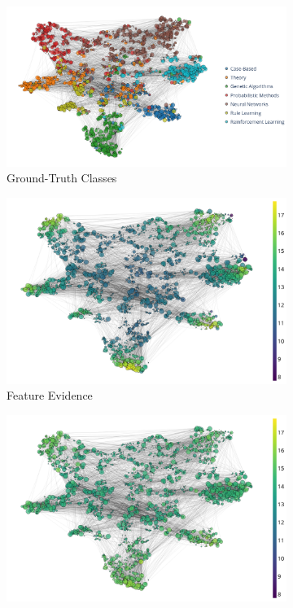\begin{figure}[!h]
    \centering
	\begin{subfigure}[t]{\textwidth}
	    \centering
		\includegraphics[height=0.25\textheight]{sections/009_neurips2021/resources/clean-classes.png}
		\caption{Ground-Truth Classes} 
		\label{subfig:latent-clean-classes}
	\end{subfigure}
	\begin{subfigure}[t]{\textwidth}
	    \centering
		\includegraphics[height=0.25\textheight]{sections/009_neurips2021/resources/clean-ft-evidence.png}
		\caption{Feature Evidence} 
		\label{subfig:latent-clean-feature-evidence}
	\end{subfigure}
	\begin{subfigure}[t]{\textwidth}
	    \centering
		\includegraphics[height=0.25\textheight]{sections/009_neurips2021/resources/clean-evidence.png}

\end{subfigure}
\end{figure}
